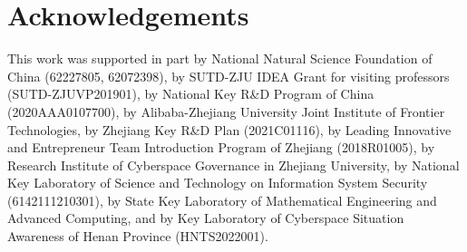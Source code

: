 \section*{Acknowledgements}
This work was supported in part by National Natural Science Foundation of China (62227805, 62072398), by SUTD-ZJU IDEA Grant for visiting professors (SUTD-ZJUVP201901), by National Key R\&D Program of China (2020AAA0107700),  by Alibaba-Zhejiang University Joint Institute of Frontier Technologies, by Zhejiang Key R\&D Plan (2021C01116), by Leading Innovative and Entrepreneur Team Introduction Program of Zhejiang (2018R01005), by Research Institute of Cyberspace Governance in Zhejiang University, by National Key Laboratory of Science and Technology on Information System Security (6142111210301), by State Key Laboratory of Mathematical Engineering and Advanced Computing, and by Key Laboratory of Cyberspace Situation Awareness of Henan Province (HNTS2022001).